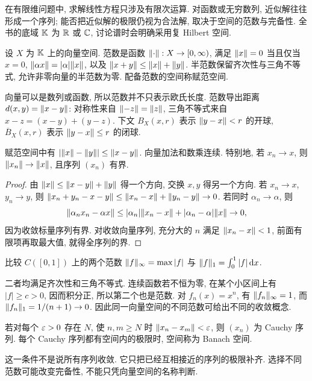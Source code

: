 \label{ch:norm}
在有限维问题中, 求解线性方程只涉及有限次运算. 对函数或无穷数列, 近似解往往形成一个序列; 能否把近似解的极限仍视为合法解, 取决于空间的范数与完备性. 全书的底域 $\mathbb K$ 为 $\mathbb R$ 或 $\mathbb C$, 讨论谱时会明确采用复 Hilbert 空间.

\begin{definition}
设 $X$ 为 $\mathbb K$ 上的向量空间. 范数是函数 $\lVert \cdot\rVert:X\to[0,\infty)$, 满足 $\lVert x\rVert=0$ 当且仅当 $x=0$, $\lVert \alpha x\rVert=|\alpha|\lVert x\rVert$, 以及 $\lVert x+y\rVert\le\lVert x\rVert+\lVert y\rVert$. 半范数保留齐次性与三角不等式, 允许非零向量的半范数为零. 配备范数的空间称赋范空间.
\end{definition}
向量可以是数列或函数, 所以范数并不只表示欧氏长度. 范数导出距离 $d(x,y)=\lVert x-y\rVert$: 对称性来自 $\lVert -z\rVert=\lVert z\rVert$, 三角不等式来自 $x-z=(x-y)+(y-z)$. 下文 $B_X(x,r)$ 表示 $\lVert y-x\rVert<r$ 的开球, $\overline B_X(x,r)$ 表示 $\lVert y-x\rVert\le r$ 的闭球.

\begin{proposition}\label{prop:normcontinuous}
赋范空间中有 $|\lVert x\rVert-\lVert y\rVert|\le\lVert x-y\rVert$. 向量加法和数乘连续. 特别地, 若 $x_n\to x$, 则 $\lVert x_n\rVert\to\lVert x\rVert$, 且序列 $(x_n)$ 有界.
\end{proposition}
\begin{proof}
由 $\lVert x\rVert\le\lVert x-y\rVert+\lVert y\rVert$ 得一个方向, 交换 $x,y$ 得另一个方向. 若 $x_n\to x$, $y_n\to y$, 则 $\lVert x_n+y_n-x-y\rVert\le\lVert x_n-x\rVert+\lVert y_n-y\rVert\to0$. 若同时 $\alpha_n\to\alpha$, 则
\[
\lVert \alpha_n x_n-\alpha x\rVert\le |\alpha_n|\lVert x_n-x\rVert+|\alpha_n-\alpha|\lVert x\rVert\to0,
\]
因为收敛标量序列有界. 对收敛向量序列, 充分大的 $n$ 满足 $\lVert x_n-x\rVert<1$, 前面有限项再取最大值, 就得全序列的界.
\end{proof}

\begin{example}\label{legacy:ch01:example1}
比较 $C([0,1])$ 上的两个范数 $\lVert f\rVert_\infty=\max|f|$ 与 $\lVert f\rVert_1=\int_0^1|f|\,\mathrm d x$.
\end{example}
\begin{solution}
二者均满足齐次性和三角不等式. 连续函数若不恒为零, 在某个小区间上有 $|f|\ge c>0$, 因而积分正, 所以第二个也是范数. 对 $f_n(x)=x^n$, 有 $\lVert f_n\rVert_\infty=1$, 而 $\lVert f_n\rVert_1=1/(n+1)\to0$. 因此同一向量空间的不同范数可给出不同的收敛概念.
\end{solution}

\begin{definition}
若对每个 $\varepsilon>0$ 存在 $N$, 使 $n,m\ge N$ 时 $\lVert x_n-x_m\rVert<\varepsilon$, 则 $(x_n)$ 为 Cauchy 序列. 每个 Cauchy 序列都有空间内的极限时, 空间称为 Banach 空间.
\end{definition}
这一条件不是说所有序列收敛. 它只把已经互相接近的序列的极限补齐. 选择不同范数可能改变完备性, 不能只凭向量空间的名称判断.

